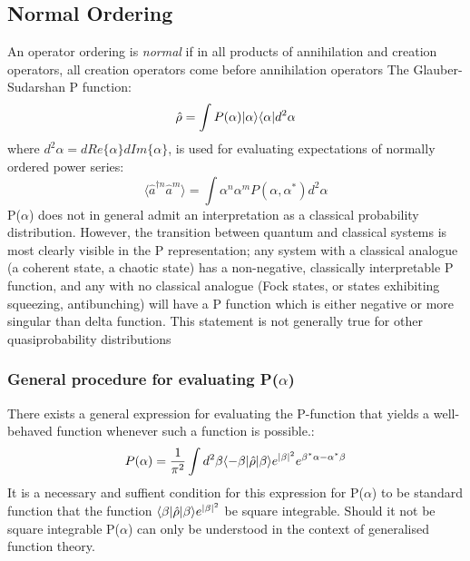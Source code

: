 \subsection{Normal Ordering}
An operator ordering is \emph{normal} if in all products of annihilation and creation operators, all creation operators come before annihilation operators \autocite{Mandl2010} The Glauber-Sudarshan P function\autocite{Cahill1969}:
\begin{equation}
	\hat{\rho} = \int P(\alpha) | \alpha \rangle \langle \alpha | d^2 \alpha
	\end{equation}
where $d^2 \alpha = dRe\{\alpha\}dIm\{\alpha\}$, is used for evaluating expectations of normally ordered power series:
\begin{equation}
	\langle \hat{a}^{\dagger n} \hat{a}^{m}  \rangle = \int \alpha^n \alpha^m P (\alpha, \alpha^*) d^2 \alpha
\end{equation}
P($\alpha$) does not in general admit an interpretation as a classical probability distribution. However, the transition between quantum and classical systems is most clearly visible in the P representation; any system with a classical analogue (a coherent state, a chaotic state) has a non-negative, classically interpretable P function, and any with no classical analogue (Fock states, or states exhibiting squeezing, antibunching) will have a P function which is either negative or more singular than delta function. This statement is not generally true for other quasiprobability distributions\autocite{Mandel1995}
\subsubsection{General procedure for evaluating P($\alpha$)}
\label{mehta}
There exists a general expression for evaluating the P-function that yields a well-behaved function whenever such a function is possible.\autocite{Mehta1967}:
\begin{equation}
	P(\alpha) = \frac{1}{\pi^2} \int d^2 \beta \langle -\beta | \hat{\rho} | \beta \rangle e^{|\beta|^2} e^{\beta^* \alpha -\alpha^* \beta}
\end{equation}
It is a necessary and suffient condition for this expression for P($\alpha$) to be standard function that the function $ \langle \beta | \hat{\rho} | \beta \rangle e^{|\beta|^2} $ be square integrable. Should it not be square integrable P($\alpha$) can only be understood in the context of generalised function theory.
